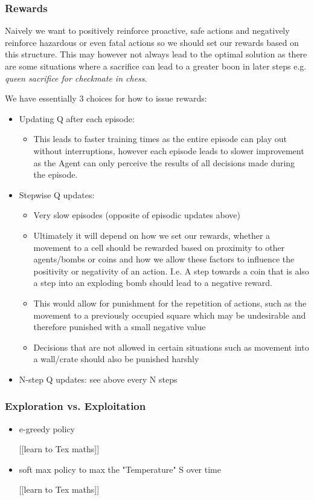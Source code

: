 \documentclass[12pt]{report}
\begin{document}
\subsubsection{Rewards}
Naively we want to positively reinforce proactive, safe actions and negatively reinforce hazardous or even fatal actions so we should set our rewards based on this structure. This may however not always lead to the optimal solution as there are some situations where a sacrifice can lead to a greater boon in later steps e.g. \textit{queen sacrifice for checkmate in chess}.

We have essentially 3 choices for how to issue rewards:
\begin{itemize}
	\item Updating Q after each episode:
	\begin{itemize}
		\item This leads to faster training times as the entire episode can play out without interruptions, however each episode leads to slower improvement as the Agent can only perceive the results of all decisions made during the episode.
	\end{itemize}

	\item Stepwise Q updates:
	\begin{itemize}
		\item Very slow episodes (opposite of episodic updates above)
		\item Ultimately it will depend on how we set our rewards, whether a movement to a cell should be rewarded based on proximity to other agents/bombs or coins and how we allow these factors to influence the positivity or negativity of an action. I.e. A step towards a coin that is also a step into an exploding bomb should lead to a negative reward.
		\item This would allow for punishment for the repetition of actions, such as the movement to a previously occupied square which may be undesirable and therefore punished with a small negative value
		\item Decisions that are not allowed in certain situations such as movement into a wall/crate should also be punished harshly
	\end{itemize}			
	\item N-step Q updates: see above every N steps
\end{itemize}

\subsubsection{Exploration vs. Exploitation}
\begin{itemize}
	\item e-greedy policy 
	
	[[learn to Tex maths]]
	\item soft max policy to max the "Temperature" S over time
	
	[[learn to Tex maths]]
\end{itemize}
\end{document}
